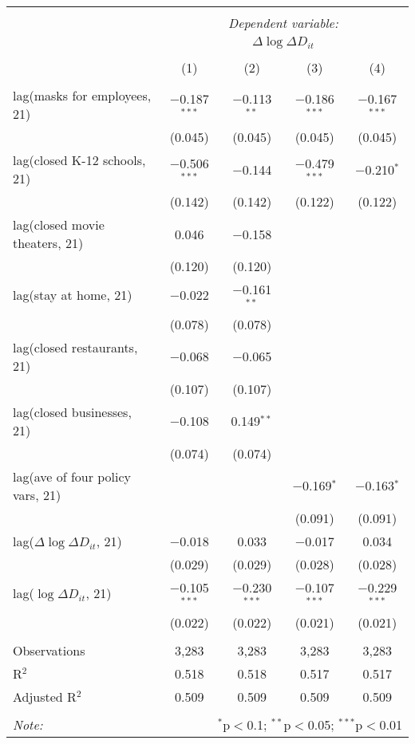 \begin{tabular}{@{\extracolsep{1pt}}lcccc} 
\\[-1.8ex]\hline 
\hline \\[-1.8ex] 
 & \multicolumn{4}{c}{\textit{Dependent variable:}} \\ 
\cline{2-5} 
 & \multicolumn{4}{c}{$\Delta \log \Delta D_{it}$} \\ 
\\[-1.8ex] & (1) & (2) & (3) & (4)\\ 
\hline \\[-1.8ex] 
 lag(masks for employees, 21) & $-$0.187$^{***}$ & $-$0.113$^{**}$ & $-$0.186$^{***}$ & $-$0.167$^{***}$ \\ 
  & (0.045) & (0.045) & (0.045) & (0.045) \\ 
  lag(closed K-12 schools, 21) & $-$0.506$^{***}$ & $-$0.144 & $-$0.479$^{***}$ & $-$0.210$^{*}$ \\ 
  & (0.142) & (0.142) & (0.122) & (0.122) \\ 
  lag(closed movie theaters, 21) & 0.046 & $-$0.158 &  &  \\ 
  & (0.120) & (0.120) &  &  \\ 
  lag(stay at home, 21) & $-$0.022 & $-$0.161$^{**}$ &  &  \\ 
  & (0.078) & (0.078) &  &  \\ 
  lag(closed restaurants, 21) & $-$0.068 & $-$0.065 &  &  \\ 
  & (0.107) & (0.107) &  &  \\ 
  lag(closed businesses, 21) & $-$0.108 & 0.149$^{**}$ &  &  \\ 
  & (0.074) & (0.074) &  &  \\ 
  lag(ave of four policy vars, 21) &  &  & $-$0.169$^{*}$ & $-$0.163$^{*}$ \\ 
  &  &  & (0.091) & (0.091) \\ 
  lag($\Delta \log \Delta D_{it}$, 21) & $-$0.018 & 0.033 & $-$0.017 & 0.034 \\ 
  & (0.029) & (0.029) & (0.028) & (0.028) \\ 
  lag($\log \Delta D_{it}$, 21) & $-$0.105$^{***}$ & $-$0.230$^{***}$ & $-$0.107$^{***}$ & $-$0.229$^{***}$ \\ 
  & (0.022) & (0.022) & (0.021) & (0.021) \\ 
 \hline \\[-1.8ex] 
Observations & 3,283 & 3,283 & 3,283 & 3,283 \\ 
R$^{2}$ & 0.518 & 0.518 & 0.517 & 0.517 \\ 
Adjusted R$^{2}$ & 0.509 & 0.509 & 0.509 & 0.509 \\ 
\hline 
\hline \\[-1.8ex] 
\textit{Note:}  & \multicolumn{4}{r}{$^{*}$p$<$0.1; $^{**}$p$<$0.05; $^{***}$p$<$0.01} \\ 
\end{tabular} 